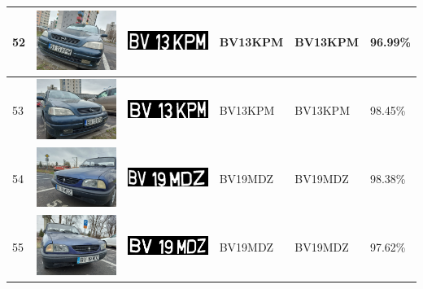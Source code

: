 \documentclass[a4paper,12pt]{report}
\begin{document}
\begin{longtable}{| m{0.6cm} | m{3cm} | m{3cm} | m{1.8cm} | m{1.8cm} | m{1.8cm} |}
    52  & \includegraphics[width=3cm,keepaspectratio]{dataset/29_d2.jpg}  & \includegraphics[width=3cm,keepaspectratio]{segmentari/52.jpg}  & BV13KPM             & BV13KPM              & 96.99\%    \\ \hline
    53  & \includegraphics[width=3cm,keepaspectratio]{dataset/29_s1.jpg}  & \includegraphics[width=3cm,keepaspectratio]{segmentari/53.jpg}  & BV13KPM             & BV13KPM              & 98.45\%    \\ \hline
    54  & \includegraphics[width=3cm,keepaspectratio]{dataset/30_d1.jpg}  & \includegraphics[width=3cm,keepaspectratio]{segmentari/54.jpg}  & BV19MDZ             & BV19MDZ              & 98.38\%    \\ \hline
    55  & \includegraphics[width=3cm,keepaspectratio]{dataset/30_s1.jpg}  & \includegraphics[width=3cm,keepaspectratio]{segmentari/55.jpg}  & BV19MDZ             & BV19MDZ              & 97.62\%    \\ \hline

\end{longtable}
\end{document}
